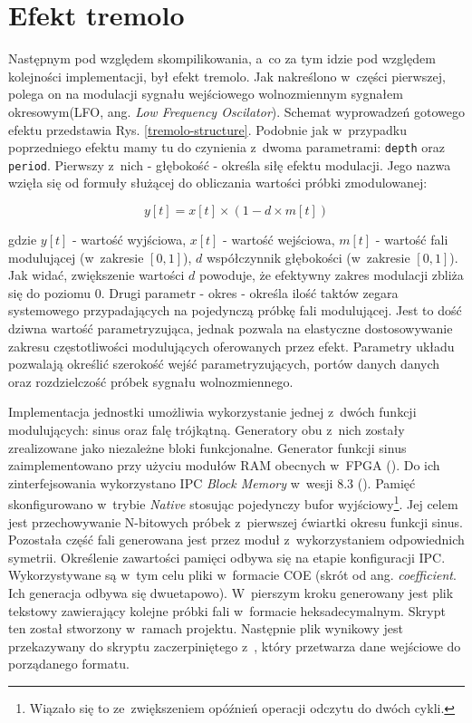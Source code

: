 \section{Efekt tremolo}

Następnym pod względem skompilikowania, a~co za tym idzie pod względem kolejności implementacji, był efekt tremolo. Jak nakreślono w~części pierwszej, polega on na modulacji sygnału wejściowego wolnozmiennym sygnałem okresowym(LFO, ang. \textit{Low Frequency Oscilator}). Schemat wyprowadzeń gotowego efektu przedstawia Rys. \ref{tremolo-structure}. Podobnie jak w~przypadku poprzedniego efektu mamy tu do czynienia z~dwoma parametrami: \verb|depth| oraz \verb|period|. Pierwszy z~nich - głębokość - określa siłę efektu modulacji. Jego nazwa wzięła się od formuły służącej do obliczania wartości próbki zmodulowanej: 

\begin{equation}
    y[t] = x[t] \times (1 - d \times m[t])
\end{equation}

\noindent
gdzie $y[t]$ - wartość wyjściowa, $x[t]$ - wartość wejściowa, $m[t]$ - wartość fali modulującej (w~zakresie $[0,1]$), $d$ współczynnik głębokości (w~zakresie $[0,1]$). Jak widać, zwiększenie wartości $d$ powoduje, że efektywny zakres modulacji zbliża się do poziomu $0$. Drugi parametr - okres - określa ilość taktów zegara systemowego przypadających na pojedynczą próbkę fali modulującej. Jest to dość dziwna wartość parametryzująca, jednak pozwala na elastyczne dostosowywanie zakresu częstotliwości modulujących oferowanych przez efekt. Parametry układu pozwalają określić szerokość wejść parametryzujących, portów danych danych oraz rozdzielczość próbek sygnału wolnozmiennego.

Implementacja jednostki umożliwia wykorzystanie jednej z~dwóch funkcji modulujących: sinus oraz falę trójkątną. Generatory obu z~nich zostały zrealizowane jako niezależne bloki funkcjonalne. Generator funkcji sinus zaimplementowano przy użyciu modułów RAM obecnych w~FPGA (\cite{xilinx_memory_seven}). Do ich zinterfejsowania wykorzystano IPC \textit{Block Memory} w~wesji 8.3 (\cite{xilinx_bram_wizard}). Pamięć skonfigurowano w~trybie \textit{Native} stosując pojedynczy bufor wyjściowy\footnote{Wiązało się to ze~zwiększeniem opóźnień operacji odczytu do dwóch cykli.}. Jej celem jest przechowywanie N-bitowych próbek z~pierwszej ćwiartki okresu funkcji sinus. Pozostała część fali generowana jest przez moduł z~wykorzystaniem odpowiednich symetrii. Określenie zawartości pamięci odbywa się na etapie konfiguracji IPC. Wykorzystywane są w~tym celu pliki w~formacie COE (skrót od ang. \textit{coefficient}. Ich generacja odbywa się dwuetapowo). W~pierszym kroku generowany jest plik tekstowy zawierający kolejne próbki fali w~formacie heksadecymalnym. Skrypt ten został stworzony w~ramach projektu. Następnie plik wynikowy jest przekazywany do skryptu zaczerpiniętego z~\cite{coe_generator}, który przetwarza dane wejściowe do porządanego formatu.

